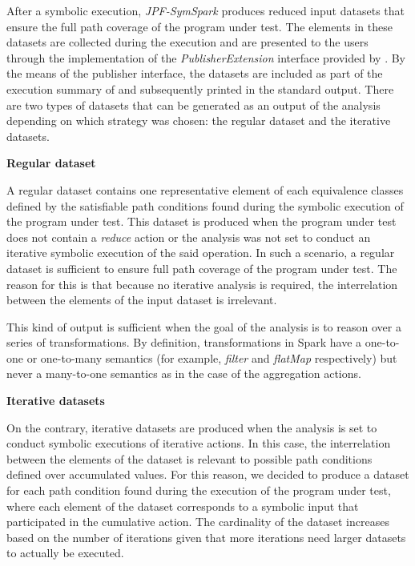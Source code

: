 \label{subsec:module:output}

%
%

After a symbolic execution, \textit{JPF-SymSpark} produces reduced input datasets that ensure the full path coverage of the program under test. The elements in these datasets are collected during the execution and are presented to the users through the implementation of the \textit{PublisherExtension} interface provided by \jpf{}. By the means of the publisher interface, the datasets are included as part of the execution summary of \jpf{} and subsequently printed in the standard output. There are two types of datasets that can be generated as an output of the analysis depending on which strategy was chosen: the regular dataset and the iterative datasets.

\textbf{Regular dataset}

A regular dataset contains one representative element of each equivalence classes defined by the satisfiable path conditions found during the symbolic execution of the program under test. This dataset is produced when the program under test does not contain a \textit{reduce} action or the analysis was not set to conduct an iterative symbolic execution of the said operation. In such a scenario, a regular dataset is sufficient to ensure full path coverage of the program under test. The reason for this is that because no iterative analysis is required, the interrelation between the elements of the input dataset is irrelevant. 

This kind of output is sufficient when the goal of the analysis is to reason over a series of transformations. By definition, transformations in Spark have a one-to-one or one-to-many semantics (for example, \textit{filter} and \textit{flatMap} respectively) but never a many-to-one semantics as in the case of the aggregation actions. 

\clearpage

\textbf{Iterative datasets}

On the contrary, iterative datasets are produced when the analysis is set to conduct symbolic executions of iterative actions. In this case, the interrelation between the elements of the dataset is relevant to possible path conditions defined over accumulated values. For this reason, we decided to produce a dataset for each path condition found during the execution of the program under test, where each element of the dataset corresponds to a symbolic input that participated in the cumulative action. The cardinality of the dataset increases based on the number of iterations given that more iterations need larger datasets to actually be executed.

